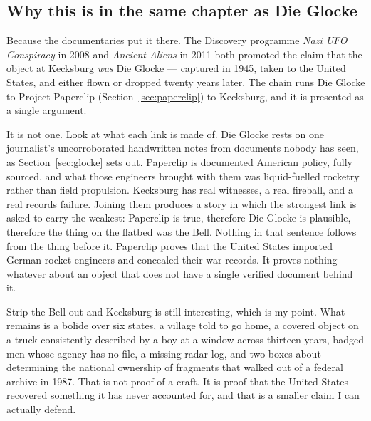 \subsection*{Why this is in the same chapter as Die Glocke}

Because the documentaries put it there. The Discovery programme \emph{Nazi UFO Conspiracy} in 2008
and \emph{Ancient Aliens} in 2011 both promoted the claim that the object at Kecksburg \emph{was}
Die Glocke --- captured in 1945, taken to the United States, and either flown or dropped twenty
years later. The chain runs Die Glocke to Project Paperclip (Section~\ref{sec:paperclip}) to
Kecksburg, and it is presented as a single argument.

It is not one. Look at what each link is made of. Die Glocke rests on one journalist's uncorroborated
handwritten notes from documents nobody has seen, as Section~\ref{sec:glocke} sets out. Paperclip is
documented American policy, fully sourced, and what those engineers brought with them was
liquid-fuelled rocketry rather than field propulsion. Kecksburg has real witnesses, a real fireball,
and a real records failure. Joining them produces a story in which the strongest link is asked to
carry the weakest: Paperclip is true, therefore Die Glocke is plausible, therefore the thing on the
flatbed was the Bell. Nothing in that sentence follows from the thing before it. Paperclip proves
that the United States imported German rocket engineers and concealed their war records. It proves
nothing whatever about an object that does not have a single verified document behind it.

Strip the Bell out and Kecksburg is still interesting, which is my point. What remains is a bolide
over six states, a village told to go home, a covered object on a truck consistently described by a
boy at a window across thirteen years, badged men whose agency has no file, a missing radar log, and
two boxes about determining the national ownership of fragments that walked out of a federal archive
in 1987. That is not proof of a craft. It is proof that the United States recovered something it has
never accounted for, and that is a smaller claim I can actually defend.

